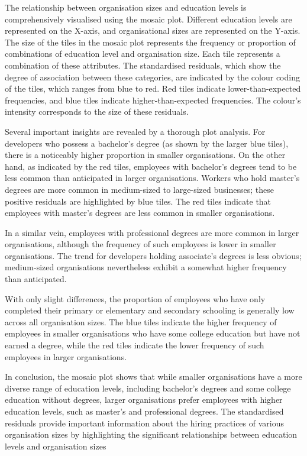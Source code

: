 \documentclass[
  12pt,
]{article}
\begin{document}
The relationship between organisation sizes and education levels is
comprehensively visualised using the mosaic plot. Different education
levels are represented on the X-axis, and organisational sizes are
represented on the Y-axis. The size of the tiles in the mosaic plot
represents the frequency or proportion of combinations of education
level and organisation size. Each tile represents a combination of these
attributes. The standardised residuals, which show the degree of
association between these categories, are indicated by the colour coding
of the tiles, which ranges from blue to red. Red tiles indicate
lower-than-expected frequencies, and blue tiles indicate
higher-than-expected frequencies. The colour's intensity corresponds to
the size of these residuals.

Several important insights are revealed by a thorough plot analysis. For
developers who possess a bachelor's degree (as shown by the larger blue
tiles), there is a noticeably higher proportion in smaller
organisations. On the other hand, as indicated by the red tiles,
employees with bachelor's degrees tend to be less common than
anticipated in larger organisations. Workers who hold master's degrees
are more common in medium-sized to large-sized businesses; these
positive residuals are highlighted by blue tiles. The red tiles indicate
that employees with master's degrees are less common in smaller
organisations.

In a similar vein, employees with professional degrees are more common
in larger organisations, although the frequency of such employees is
lower in smaller organisations. The trend for developers holding
associate's degrees is less obvious; medium-sized organisations
nevertheless exhibit a somewhat higher frequency than anticipated.

With only slight differences, the proportion of employees who have only
completed their primary or elementary and secondary schooling is
generally low across all organisation sizes. The blue tiles indicate the
higher frequency of employees in smaller organisations who have some
college education but have not earned a degree, while the red tiles
indicate the lower frequency of such employees in larger organisations.

In conclusion, the mosaic plot shows that while smaller organisations
have a more diverse range of education levels, including bachelor's
degrees and some college education without degrees, larger organisations
prefer employees with higher education levels, such as master's and
professional degrees. The standardised residuals provide important
information about the hiring practices of various organisation sizes by
highlighting the significant relationships between education levels and
organisation sizes
\end{document}
